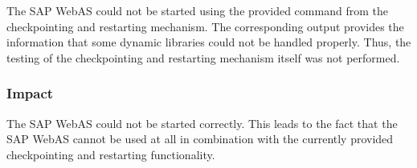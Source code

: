 The SAP WebAS could not be started using the provided command from the checkpointing and restarting mechanism. The corresponding output provides the information that some dynamic libraries could not be handled properly. Thus, the testing of the checkpointing and restarting mechanism itself was not performed.

\subsubsection{Impact}
The SAP WebAS could not be started correctly. This leads to the fact that the SAP WebAS cannot be used at all in combination with the currently provided checkpointing and restarting functionality.
